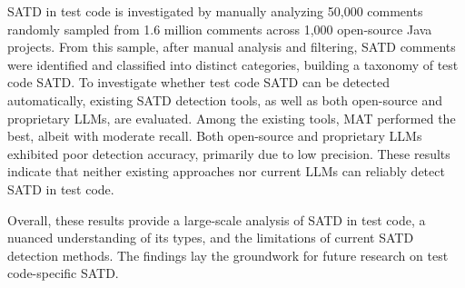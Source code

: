 SATD in test code is investigated by manually analyzing 50,000 comments randomly sampled from 1.6 million comments across 1,000 open-source Java projects. From this sample, after manual analysis and filtering, \totalSatdCount{} SATD comments were identified and classified into \categoryCount{} distinct categories, building a taxonomy of test code SATD. To investigate whether test code SATD can be detected automatically, existing SATD detection tools, as well as both open-source and proprietary LLMs, are evaluated. Among the existing tools, MAT performed the best, albeit with moderate recall. Both open-source and proprietary LLMs exhibited poor detection accuracy, primarily due to low precision. These results indicate that neither existing approaches nor current LLMs can reliably detect SATD in test code.

Overall, these results provide a large-scale analysis of SATD in test code, a nuanced understanding of its types, and the limitations of current SATD detection methods. The findings lay the groundwork for future research on test code-specific SATD.

\clearpage






